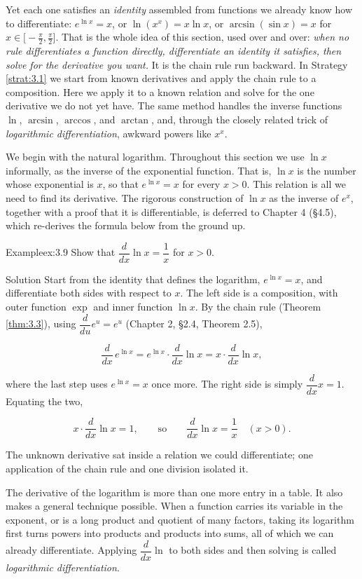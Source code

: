 \documentclass[a4paper,12pt,oneside]{memoir}
\begin{document}
Yet each one satisfies an \emph{identity} assembled from functions we already know how to differentiate: \(e^{\ln x} = x\), or \(\ln(x^{x}) = x\ln x\), or \(\arcsin(\sin x) = x\) for \(x \in \bigl[-\tfrac{\pi}{2}, \tfrac{\pi}{2}\bigr]\). That is the whole idea of this section, used over and over: \emph{when no rule differentiates a function directly, differentiate an identity it satisfies, then solve for the derivative you want.} It is the chain rule run backward. In Strategy \ref{strat:3.1} we start from known derivatives and apply the chain rule to a composition. Here we apply it to a known relation and solve for the one derivative we do not yet have. The same method handles the inverse functions \(\ln\), \(\arcsin\), \(\arccos\), and \(\arctan\), and, through the closely related trick of \emph{logarithmic differentiation}, awkward powers like \(x^{x}\).

We begin with the natural logarithm. Throughout this section we use \(\ln x\) informally, as the inverse of the exponential function. That is, \(\ln x\) is the number whose exponential is \(x\), so that \(e^{\ln x} = x\) for every \(x > 0\). This relation is all we need to find its derivative. The rigorous construction of \(\ln x\) as the inverse of \(e^{x}\), together with a proof that it is differentiable, is deferred to Chapter 4 (§4.5), which re-derives the formula below from the ground up.

\begin{workedexample}
\begin{envexample}{Example}{ex:3.9}{}
Show that \(\dfrac{d}{dx}\ln x = \dfrac{1}{x}\) for \(x > 0\).
\end{envexample}
\begin{envsolution}{Solution}{}{}
Start from the identity that defines the logarithm, \(e^{\ln x} = x\), and differentiate both sides with respect to \(x\). The left side is a composition, with outer function \(\exp\) and inner function \(\ln x\). By the chain rule (Theorem \ref{thm:3.3}), using \(\dfrac{d}{du}e^{u} = e^{u}\) (Chapter 2, §2.4, Theorem 2.5),

\[ \frac{d}{dx}\,e^{\ln x} = e^{\ln x}\cdot\frac{d}{dx}\ln x = x\cdot\frac{d}{dx}\ln x, \]

where the last step uses \(e^{\ln x} = x\) once more. The right side is simply \(\dfrac{d}{dx}x = 1\). Equating the two,

\[ x\cdot\frac{d}{dx}\ln x = 1, \qquad\text{so}\qquad \frac{d}{dx}\ln x = \frac{1}{x} \quad (x > 0). \]

The unknown derivative sat inside a relation we could differentiate; one application of the chain rule and one division isolated it.
\end{envsolution}
\end{workedexample}
The derivative of the logarithm is more than one more entry in a table. It also makes a general technique possible. When a function carries its variable in the exponent, or is a long product and quotient of many factors, taking its logarithm first turns powers into products and products into sums, all of which we can already differentiate. Applying \(\dfrac{d}{dx}\ln\) to both sides and then solving is called \emph{logarithmic differentiation}.
\end{document}
